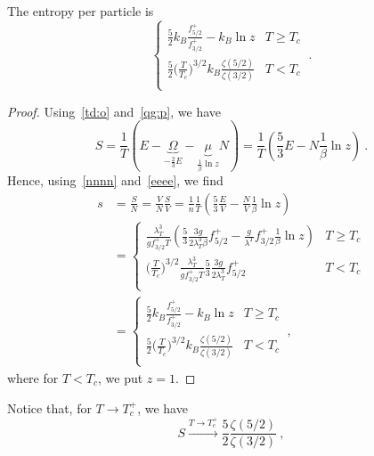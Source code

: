     The entropy per particle is 
    \begin{equation*}
        \begin{cases}
            \frac{5}{2} k_B \frac{f^+_{5/2}}{f^+_{3/2}} - k_B \ln z & T \geq T_c \\
            \frac{5}{2} \Big ( \frac{T}{T_c} \Big)^{3/2} k_B \frac{\zeta(5/2)}{\zeta(3/2)} & T < T_c \\
        \end{cases} ~.
    \end{equation*}
    \begin{proof}
        Using~\eqref{td:o} and~\eqref{qg:p}, we have 
        \begin{equation*}
            S = \frac{1}{T} (E - \underbrace{\Omega}_{- \frac{2}{3}E} - \underbrace{\mu}_{\frac{1}{\beta} \ln z} N) = \frac{1}{T} (\frac{5}{3} E - N \frac{1}{\beta} \ln z)  ~.
        \end{equation*}
        Hence, using~\eqref{nnnn} and~\eqref{eeee}, we find
        \begin{equation*}
        \begin{aligned}
            s & = \frac{S}{N} = \frac{V}{N} \frac{S}{V} = \frac{1}{n} \frac{1}{T} (\frac{5}{3} \frac{E}{V} - \frac{N}{V} \frac{1}{\beta} \ln z) \\ & = \begin{cases}
                \frac{\lambda_T^3}{g f^+_{3/2} T} ( \frac{5}{3} \frac{3g}{2 \lambda_T^3 \beta} f^+_{5/2} - \frac{g}{\lambda^T} f^+_{3/2} \frac{1}{\beta} \ln z) & T \geq T_c \\
                \Big ( \frac{T}{T_c} \Big)^{3/2} \frac{\lambda_T^3}{g f^+_{3/2} T} \frac{5}{3} \frac{3g}{2 \lambda_T^3} f^+_{5/2} & T < T_c \\
            \end{cases} \\ & = \begin{cases}
                \frac{5}{2} k_B \frac{f^+_{5/2}}{f^+_{3/2}} - k_B \ln z & T \geq T_c \\
                \frac{5}{2} \Big ( \frac{T}{T_c} \Big)^{3/2} k_B \frac{\zeta(5/2)}{\zeta(3/2)} & T< T_c \\
            \end{cases} ~,
        \end{aligned}
        \end{equation*}
        where for $T < T_c$, we put $z = 1$.
    \end{proof}
    Notice that, for $T \rightarrow T_c^+$, we have 
    \begin{equation*}
        S \xrightarrow{T \rightarrow T_c^+} \frac{5}{2} \frac{\zeta(5/2)}{\zeta(3/2)} ~,
    \end{equation*}
